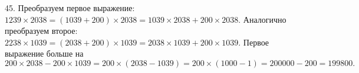 45. Преобразуем первое выражение: $1239\times2038=(1039+200)\times2038=1039\times2038+200\times2038.$ Аналогично преобразуем второе:
$2238\times1039=(2038+200)\times1039=2038\times1039+200\times1039.$ Первое выражение больше на $200\times2038-200\times1039=
200\times(2038-1039)=200\times(1000-1)=200000-200=199800.$\\
